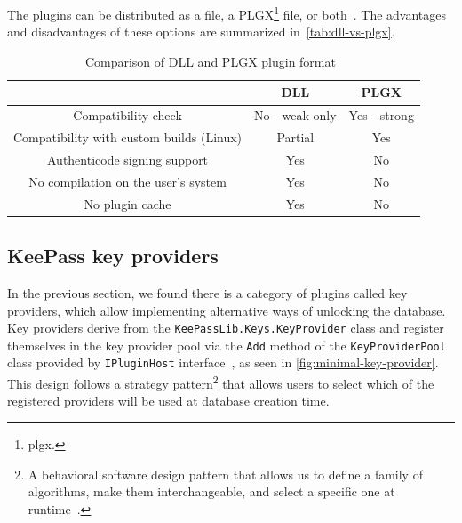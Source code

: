 The plugins can be distributed as a  file, a PLGX\footnote{\Glsdesc{plgx}.} file, or both~\cite{keepass:plugin-development}.
The advantages and disadvantages of these options are summarized in~\autoref{tab:dll-vs-plgx}.

\begin{table}[H]
	\caption[Comparison of DLL and PLGX plugin format]
	{Comparison of DLL and PLGX plugin format~\protect\cite{keepass:plugin-development}}
	\label{tab:dll-vs-plgx}

	\begin{tabular}{|c|c|c|}
		\hline
		& DLL                                       & PLGX                              \\
		\hline
		\hline
		Compatibility check                         & No - weak only    & Yes - strong  \\
		\hline
		Compatibility with custom builds (Linux)    & Partial           & Yes           \\
		\hline
		Authenticode signing support                & Yes               & No            \\
		\hline
		No compilation on the user's system         & Yes               & No            \\
		\hline
		No plugin cache                             & Yes               & No            \\
		\hline
	\end{tabular}
\end{table}

\subsection{KeePass key providers}\label{subsec:keepass-key-providers}

In the previous section, we found there is a category of plugins called key providers,
which allow implementing alternative ways of unlocking the database.
Key providers derive from the \texttt{KeePassLib.Keys.KeyProvider} class
and register themselves in the key provider pool via the \texttt{Add} method of the \texttt{KeyProviderPool} class provided by \texttt{IPluginHost} interface~\cite{keepass:key-provider-development}, as seen in \autoref{fig:minimal-key-provider}.
This design follows a strategy pattern\footnote{A behavioral software design pattern that allows us to define a family of algorithms, make them interchangeable, and select a specific one at runtime~\cite{design-patterns}.}
that allows users to select which of the registered providers will be used at database creation time.

